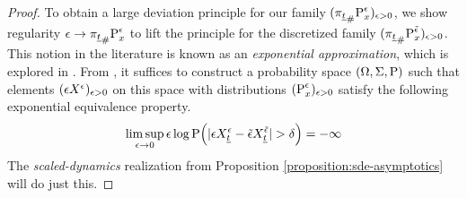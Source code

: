 \begin{proof}
  To obtain a large deviation principle for our family $(\push{\Prb^\epsilon_\stateVar}{\pi_{\underline t}})_{\epsilon>0}$, we show regularity $\epsilon \rightarrow \push{\Prb^\epsilon_\stateVar}{\pi_{\underline t}}$ to lift the principle for the discretized family $(\push{\Prb^{\tilde\epsilon}_\stateVar}{\pi_{\underline t}})_{\epsilon>0}$.
  This notion in the literature is known as an \emph{exponential approximation}, which is explored in \cite[Section 4.2.2]{dembo2010}.
  From \cite[Theorem 4.2.13]{dembo2010}, it suffices to construct a probability space $(\Omega, \Sigma, \Prb)$ such that elements $(\Xe)_{\epsilon>0}$ on this space with distributions $(\Prb^\epsilon_\stateVar)_{\epsilon>0}$ satisfy the following exponential equivalence property.
  \begin{equation*}
    \limsup_{\epsilon\rightarrow0} \epsilon\log\Prb\Big( |\epsilon\X^\epsilon_{\underline t} - \tilde\epsilon \X^{\tilde\epsilon}_{\underline t}| > \delta \Big) = -\infty
  \end{equation*}
  The \emph{scaled-dynamics} realization from Proposition \ref{proposition:sde-asymptotics} will do just this.
\end{proof}
